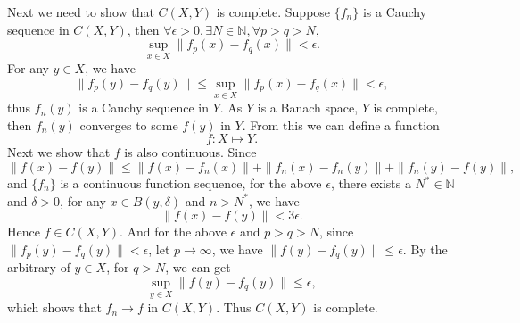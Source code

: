 \documentclass[12pt,a4paper]{ctexart}
\begin{document}
Next we need to show that $C(X, Y)$ is complete. Suppose $\{f_{n}\}$ is a Cauchy sequence in $C(X, Y)$, then $\forall \epsilon > 0, \exists N \in \mathbb{N}, \forall p > q > N$,
\begin{equation*}
    \sup_{x \in X} \|f_{p}(x) - f_{q} (x) \| < \epsilon.
\end{equation*}
For any $y \in X$, we have
\begin{equation*}
    \|f_{p}(y) - f_{q} (y) \| \leq \sup_{x \in X} \|f_{p}(x) - f_{q} (x) \| < \epsilon,
\end{equation*}
thus $f_{n}(y)$ is a Cauchy sequence in $Y$. As $Y$ is a Banach space, $Y$ is complete, then $f_{n}(y)$ converges to some $f(y)$ in $Y$. From this we can define a function
\begin{equation*}
    f: X \mapsto Y.
\end{equation*}
Next we show that $f$ is also continuous. Since
\begin{equation*}
    \|f(x) - f(y)\| \leq \|f(x) - f_{n}(x)\| + \|f_{n}(x) - f_{n}(y)\| + \|f_{n}(y) - f(y)\|,
\end{equation*}
and $\{f_{n}\}$ is a continuous function sequence, for the above $\epsilon$, there exists a $N^{*} \in \mathbb{N}$ and $\delta > 0$, for any $x \in B(y, \delta)$ and $n > N^{*}$, we have
\begin{equation*}
    \|f(x) - f(y)\| < 3 \epsilon.
\end{equation*}
Hence $f \in C(X, Y)$. And for the above $\epsilon$ and $p > q > N$, since $\|f_{p}(y) - f_{q} (y) \| < \epsilon$, let $p \to \infty$, we have $\|f(y) - f_{q}(y)\| \leq \epsilon$. By the arbitrary of $y \in X$, for $q > N$, we can get
\begin{equation*}
    \sup_{y \in X} \|f(y) - f_{q}(y)\| \leq \epsilon,
\end{equation*}
which shows that $f_{n} \to f$ in $C(X, Y)$. Thus $C(X, Y)$ is complete.

\vspace{4pt}
\end{document}
